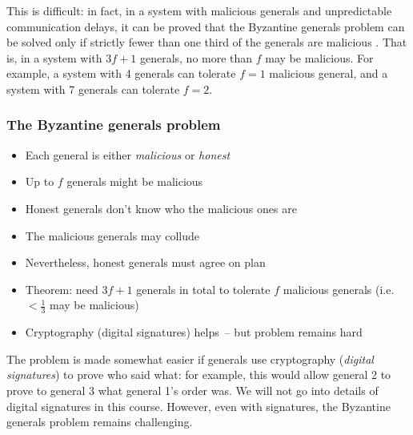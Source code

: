 This is difficult: in fact, in a system with malicious generals and unpredictable communication delays, it can be proved that the Byzantine generals problem can be solved only if strictly fewer than one third of the generals are malicious \citep[Theorem 4.4]{Dwork:1988dr}.
That is, in a system with $3f+1$ generals, no more than $f$ may be malicious.
For example, a system with 4 generals can tolerate $f=1$ malicious general, and a system with 7 generals can tolerate $f=2$.

\begin{frame}
    \label{s:byzantine-discussion}
    \frametitle{The Byzantine generals problem}
    \begin{itemize}
        \item Each general is either \emph{malicious} or \emph{honest}\\[0.5em]
        \item Up to $f$ generals might be malicious\\[0.5em]
        \item Honest generals don't know who the malicious ones are\\[0.5em]
        \item The malicious generals may collude\\[0.5em]
        \item Nevertheless, honest generals must agree on plan\\[2em]\pause
        \item Theorem: need $3f+1$ generals in total to tolerate $f$ malicious generals (i.e.\ $< \frac{1}{3}$ may be malicious)\\[0.5em]
        \item Cryptography (digital signatures) helps~-- but problem remains hard\\[0.5em]
    \end{itemize}
\end{frame}

The problem is made somewhat easier if generals use cryptography (\emph{digital signatures}) to prove who said what: for example, this would allow general 2 to prove to general 3 what general 1's order was.
We will not go into details of digital signatures in this course.
However, even with signatures, the Byzantine generals problem remains challenging.

